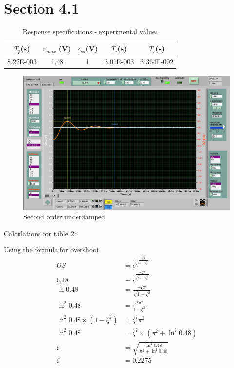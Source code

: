\documentclass{article}
\begin{document}

\section*{Section 4.1} %
\label{sec:section_4_1}

\begin{table}[ht]
\centering
    \begin{tabular}{|c|c|c|c|c|}
        \hline
        $T_p$(s) & $c_{max}$ (V) & $c_{ss}$(V) & $T_r$(s) & $T_s$(s)\\
        \hline
        8.22E-003 & 1.48 & 1 & 3.01E-003 & 3.364E-002\\
        \hline
    \end{tabular}
    \caption{Response specifications - experimental values}
\end{table}

\begin{figure}[ht]
\centering
\includegraphics[width=7in]{4_1.jpg}
\caption{Second order underdamped}
\end{figure}

Calculations for table 2:

Using the formula for overshoot
\begin{align*}
    OS &= e^{\frac{-\zeta\pi}{\sqrt{1-\zeta^2}}}\\
    0.48 &= e^{\frac{-\zeta\pi}{\sqrt{1-\zeta^2}}}\\
    \ln {0.48} &= \frac{-\zeta\pi}{\sqrt{1-\zeta^2}}\\
    \ln^2 {0.48} &= \frac{\zeta^2\pi^2}{1-\zeta^2}\\
    \ln^2 {0.48} \times (1-\zeta^2) &= \zeta^2\pi^2\\
    \ln^2 {0.48} &= \zeta^2 \times (\pi^2 +\ln^2 {0.48}) \\
    \zeta &= \sqrt{\frac{\ln^2 {0.48}}{\pi^2 +\ln^2 {0.48}}} \\
    \zeta &=  0.2275\\
\end{align*}
\end{document}

